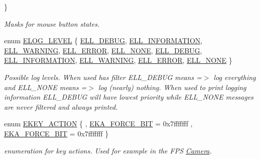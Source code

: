 \begin{DoxyCompactItemize}
 \}\begin{DoxyCompactList}\small\item\em Masks for mouse button states. \end{DoxyCompactList}
\item 
enum \hyperlink{namespaceirr_aa2d1cac68606a25ed24cfffccfa30a92}{E\+L\+O\+G\+\_\+\+L\+E\+V\+EL} \{ \newline
\hyperlink{namespaceirr_aa2d1cac68606a25ed24cfffccfa30a92acb213ad3a563100198dbd7609da56151}{E\+L\+L\+\_\+\+D\+E\+B\+UG}, 
\hyperlink{namespaceirr_aa2d1cac68606a25ed24cfffccfa30a92aaed3e0f449ad8851a1bb501d4df1c0e7}{E\+L\+L\+\_\+\+I\+N\+F\+O\+R\+M\+A\+T\+I\+ON}, 
\hyperlink{namespaceirr_aa2d1cac68606a25ed24cfffccfa30a92a0f67af3d2f419bf35ca3616c4a704ff5}{E\+L\+L\+\_\+\+W\+A\+R\+N\+I\+NG}, 
\hyperlink{namespaceirr_aa2d1cac68606a25ed24cfffccfa30a92a702f1169109f7c4e2d5551a542fb333c}{E\+L\+L\+\_\+\+E\+R\+R\+OR}, 
\newline
\hyperlink{namespaceirr_aa2d1cac68606a25ed24cfffccfa30a92a1756c34c5b4a66210560fc5ade78450a}{E\+L\+L\+\_\+\+N\+O\+NE}, 
\hyperlink{namespaceirr_aa2d1cac68606a25ed24cfffccfa30a92acb213ad3a563100198dbd7609da56151}{E\+L\+L\+\_\+\+D\+E\+B\+UG}, 
\hyperlink{namespaceirr_aa2d1cac68606a25ed24cfffccfa30a92aaed3e0f449ad8851a1bb501d4df1c0e7}{E\+L\+L\+\_\+\+I\+N\+F\+O\+R\+M\+A\+T\+I\+ON}, 
\hyperlink{namespaceirr_aa2d1cac68606a25ed24cfffccfa30a92a0f67af3d2f419bf35ca3616c4a704ff5}{E\+L\+L\+\_\+\+W\+A\+R\+N\+I\+NG}, 
\newline
\hyperlink{namespaceirr_aa2d1cac68606a25ed24cfffccfa30a92a702f1169109f7c4e2d5551a542fb333c}{E\+L\+L\+\_\+\+E\+R\+R\+OR}, 
\hyperlink{namespaceirr_aa2d1cac68606a25ed24cfffccfa30a92a1756c34c5b4a66210560fc5ade78450a}{E\+L\+L\+\_\+\+N\+O\+NE}
 \}\begin{DoxyCompactList}\small\item\em Possible log levels. When used has filter E\+L\+L\+\_\+\+D\+E\+B\+UG means =$>$ log everything and E\+L\+L\+\_\+\+N\+O\+NE means =$>$ log (nearly) nothing. When used to print logging information E\+L\+L\+\_\+\+D\+E\+B\+UG will have lowest priority while E\+L\+L\+\_\+\+N\+O\+NE messages are never filtered and always printed. \end{DoxyCompactList}
\item 
enum \hyperlink{namespaceirr_aa9946ac9f3142f9e790ce52d59fd6168}{E\+K\+E\+Y\+\_\+\+A\+C\+T\+I\+ON} \{ , \hyperlink{namespaceirr_aa9946ac9f3142f9e790ce52d59fd6168a8329ce2269a20c9da94c54bc9a2d2312}{E\+K\+A\+\_\+\+F\+O\+R\+C\+E\+\_\+B\+IT} = 0x7fffffff
, \hyperlink{namespaceirr_aa9946ac9f3142f9e790ce52d59fd6168a8329ce2269a20c9da94c54bc9a2d2312}{E\+K\+A\+\_\+\+F\+O\+R\+C\+E\+\_\+B\+IT} = 0x7fffffff
 \}\begin{DoxyCompactList}\small\item\em enumeration for key actions. Used for example in the F\+PS \hyperlink{classCamera}{Camera}. \end{DoxyCompactList}
\end{DoxyCompactItemize}
